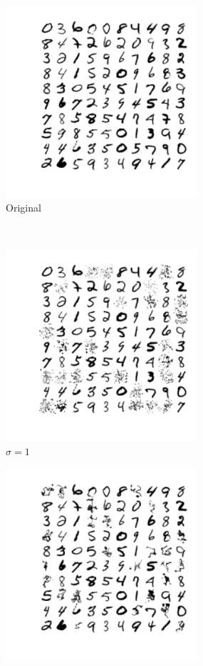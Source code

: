 \documentclass[11pt]{article}
\begin{document}
\begin{figure}[htp]
    \centering
    \begin{subfigure}[t]{0.45\textwidth}
        \centering
        \includegraphics[height=2.8in]{ela_org}
        \caption{Original}
    \end{subfigure}
    ~ 
    \begin{subfigure}[t]{0.45\textwidth}
        \centering
        \includegraphics[height=2.8in]{ela_sig_1}
        \caption{$\sigma = 1$}
    \end{subfigure}
    \begin{subfigure}[t]{0.45\textwidth}
        \centering
        \includegraphics[height=2.8in]{ela_sig_2}

\end{subfigure}
\end{figure}
\end{document}

